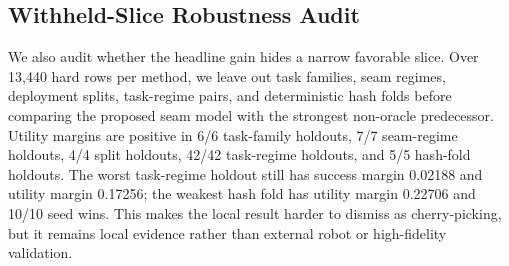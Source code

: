 \documentclass{article}
\begin{document}
\subsection{Withheld-Slice Robustness Audit}
We also audit whether the headline gain hides a narrow favorable slice. Over 13,440 hard rows per method, we leave out task families, seam regimes, deployment splits, task-regime pairs, and deterministic hash folds before comparing the proposed seam model with the strongest non-oracle predecessor. Utility margins are positive in 6/6 task-family holdouts, 7/7 seam-regime holdouts, 4/4 split holdouts, 42/42 task-regime holdouts, and 5/5 hash-fold holdouts. The worst task-regime holdout still has success margin 0.02188 and utility margin 0.17256; the weakest hash fold has utility margin 0.22706 and 10/10 seed wins. This makes the local result harder to dismiss as cherry-picking, but it remains local evidence rather than external robot or high-fidelity validation.
\begin{table}[t]\centering\small\resizebox{0.94\linewidth}{!}{}\caption{Withheld-slice local robustness audit. Each row reports the weakest proposed-minus-strongest-baseline margin over a family of hard-slice holdouts; this is not external evidence.}\label{tab:holdout}\end{table}
\end{document}
